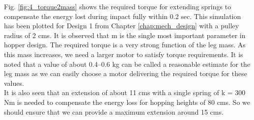 Fig. \ref{fig:4_torque2mass} shows the required torque  for extending springs to compensate the energy lost during impact fully within 0.2 sec. This simulation has been plotted for Design 1 from Chapter \ref {chap:mech_design} with a pulley radius of 2 cms. It is
observed that m is the single most important parameter in hopper design. The required torque is a very strong function of the leg mass. As this mass increases, we need a larger motor to satisfy torque requirements. It is noted that a value of about 0.4--0.6 kg
can be called a reasonable estimate for the leg mass as we can easily choose a motor delivering the required torque for these values.\\

It is also seen that an extension of about 11 cms with a single spring of k = 300 Nm is needed to compensate the energy loss for 
hopping heights of 80 cms. So we should ensure that we can provide a maximum extension around 15 cms.

